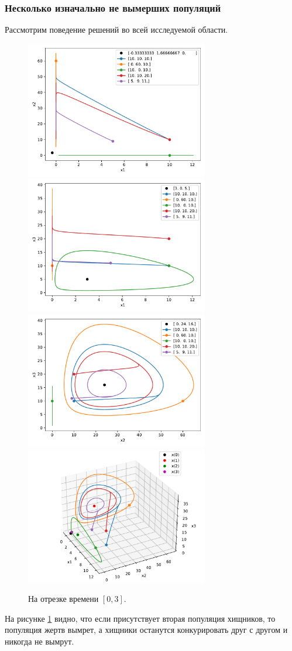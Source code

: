     \subsubsection{Несколько изначально не вымерших популяций}
    Рассмотрим поведение решений во всей исследуемой области.
    \begin{figure}[H]
        \centering
        \includegraphics[width=8cm]{pictures/x_12phase.pdf}
        \includegraphics[width=8cm]{pictures/x_13phase.pdf}
        \includegraphics[width=8cm]{pictures/x_23phase.pdf}
        \includegraphics[width=8cm]{pictures/x_phase3.pdf}
        \caption{На отрезке времени \( [0, 3] \).} \label{lv3d}
    \end{figure}
    На рисунке \ref{lv3d} видно, что если присутствует вторая популяция хищников, то популяция жертв вымрет, а хищники останутся конкурировать друг с другом и никогда не вымрут. 
